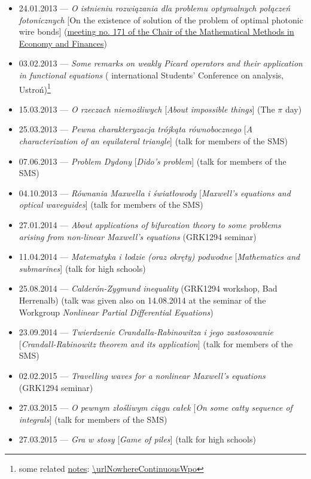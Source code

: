 \begin{itemize}
  \item 24.01.2013 --- \textsl{O istnieniu rozwiązania dla problemu optymalnych połączeń fotonicznych} [On the existence of solution of the problem of optimal photonic wire bonds] (\href{http://www.math.us.edu.pl/instytut/zrf/sem_mf_sl.html}{meeting no. 171 of the Chair of the Mathematical Methods in Economy and Finances})
  \item 03.02.2013 --- \textsl{Some remarks on weakly Picard operators and their application in functional equations} ( international Students' Conference on analysis, Ustroń)\footnote{some related \href{\urlNowhereContinuousWpoPdf}{notes}: \url{\urlNowhereContinuousWpo}}
  \item 15.03.2013 --- \textsl{O rzeczach niemożliwych} [\textsl{About impossible things}] (The $\pi$ day)
  \item 25.03.2013 --- \textsl{Pewna charakteryzacja trójkąta równobocznego} [\textsl{A characterization of an equilateral triangle}] (talk for members of the SMS)
  \item 07.06.2013 --- \textsl{Problem Dydony} [\textsl{Dido's problem}] (talk for members of the SMS)
  \item 04.10.2013 --- \textsl{Równania Maxwella i światłowody} [\textsl{Maxwell's equations and optical waveguides}] (talk for members of the SMS)
  \item 27.01.2014 --- \textsl{About applications of bifurcation theory to some problems arising from non-linear Maxwell's equations} (GRK1294 seminar)
  \item 11.04.2014 --- \textsl{Matematyka i łodzie (oraz okręty) podwodne} [\textsl{Mathematics and submarines}] (talk for high schools)
  \item 25.08.2014 --- \textsl{Calderón-Zygmund inequality} (GRK1294 workshop, Bad Herrenalb) (talk was given also on 14.08.2014 at the seminar of the Workgroup \textit{Nonlinear Partial Differential Equations})
  \item 23.09.2014 --- \textsl{Twierdzenie Crandalla-Rabinowitza i jego zastosowanie} [\textsl{Crandall-Rabinowitz theorem and its application}] (talk for members of the SMS)
  \item 02.02.2015 --- \textsl{Travelling waves for a nonlinear Maxwell's equations} (GRK1294 seminar)
  \item 27.03.2015 --- \textsl{O pewnym złośliwym ciągu całek} [\textsl{On some catty sequence of integrals}] (talk for members of the SMS)
  \item 27.03.2015 --- \textsl{Gra w stosy} [\textsl{Game of piles}] (talk for high schools)

\end{itemize}
